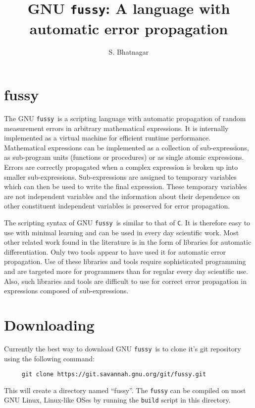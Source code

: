 \documentclass[11pt]{article}
\newcommand{\Fussy}{GNU {\tt fussy}}
\newcommand{\PDFVersion}  {\htmladdnormallinkfoot{PDF version}{http://www.aoc.nrao.edu/~sbhatnag/Softwares/fussy/fussy.pdf}}
\begin{document}
\title{{\Fussy}: A language with automatic error propagation}
\author{S. Bhatnagar}
\date{}
\normalsize


\section*{fussy}
The \Fussy\ is a scripting language with automatic propagation of random
measurement errors in arbitrary mathematical expressions.  It is internally implemented
as a virtual machine for efficient runtime performance.  Mathematical
expressions can be implemented as a collection of sub-expressions, as sub-program units
(functions or procedures) or as single atomic expressions.  Errors are correctly
propagated when a complex expression is broken up into smaller sub-expressions.
Sub-expressions are assigned to temporary variables which can then be used to write the
final expression.  These temporary variables are not independent variables and the
information about their dependence on other constituent independent variables is
preserved for error propagation.

The scripting syntax of \Fussy\ is similar to that of {\tt C}.  It is therefore easy to
use with minimal learning and can be used in every day scientific work.  Most other
related work found in the literature is in the form of libraries for automatic
differentiation.  Only two tools appear to have used it for automatic error propagation.
Use of these libraries and tools require sophisticated programming and are targeted more
for programmers than for regular every day scientific use.  Also, such libraries and
tools are difficult to use for correct error propagation in expressions composed of
sub-expressions.

\section*{Downloading}
Currently the best way to download \Fussy\ is to clone it's git repository using the
following command:
\begin{verbatim}
     git clone https://git.savannah.gnu.org/git/fussy.git
\end{verbatim}
This will create a directory named ``fussy''.  The {\tt fussy} can be compiled on most
GNU Linux, Linux-like OSes by running the {\tt build} script in this directory.
\end{document}

